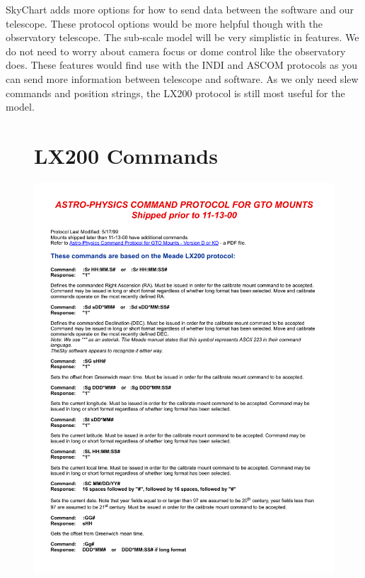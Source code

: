 \documentclass[12pt]{report}
\begin{document}
SkyChart adds more options for how to send data between the software and our telescope. These protocol options would be more helpful though with the observatory telescope. The sub-scale model will be very simplistic in features. We do not need to worry about camera focus or dome control like the observatory does. These features would find use with the INDI and ASCOM protocols as you can send more information between telescope and software. As we only need slew commands and position strings, the LX200 protocol is still most useful for the model.

\newpage %

\begin{figure}
	\section*{LX200 Commands}
	\includegraphics[height=\textheight,width=\linewidth]{LX200commands}
\end{figure}
\end{document}
